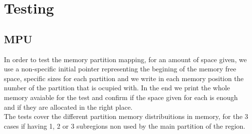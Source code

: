\chapter{Testing}

\section{MPU}
In order to test the memory partition mapping, for an amount of space given, we use a non-specific initial
 pointer representing the begining of the memory free space, specific sizes for each partition and we
  write in each memory position the number of the partition that is ocupied with. In the end we print the
   whole memory avaiable for the test and confirm if the space given for each is enough and if they are
    allocated in the right place.\\
 The tests cover the different partition memory distribuitions in memory, for the 3 cases if having 1, 2 or
  3 subregions non used by the main partition of the region.
